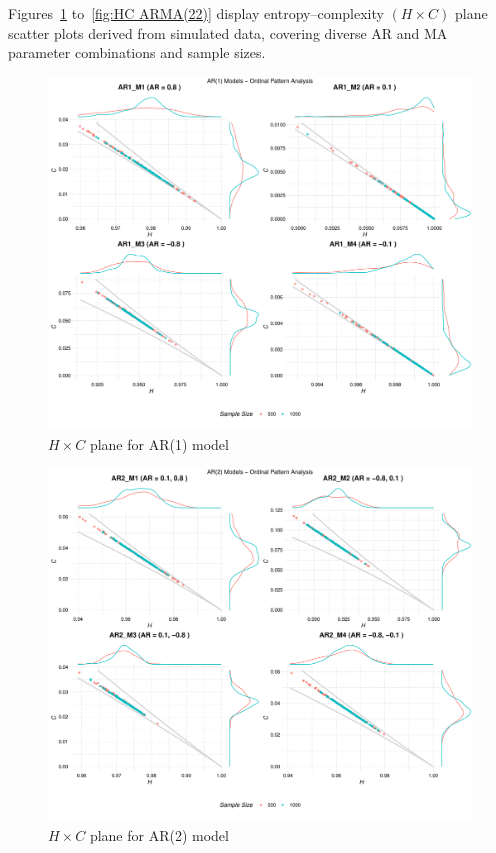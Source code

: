 \documentclass[12pt,a4paper]{article}
\begin{document}
Figures~\ref{fig:HC AR(1)} to~\ref{fig:HC ARMA(22)}  display entropy–complexity $(H \times C)$ plane scatter plots derived from simulated data, covering diverse AR and MA parameter combinations and sample sizes.

\begin{figure}[H]
	\includegraphics[width=0.9 \textwidth]{AR1_combined_analysis}
	\caption{$H \times C$ plane for AR(1) model}
	\label{fig:HC AR(1)}
\end{figure}	

\begin{figure}[H]
	\includegraphics[width=0.9 \textwidth]{AR2_combined_analysis}
	\caption{$H \times C$ plane for AR(2) model}
	\label{fig:HC AR(2)}
\end{figure}
\end{document}

